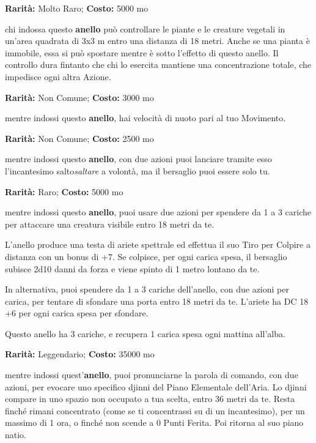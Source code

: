 \begin{multicols}{2}

\textbf{Rarità:} Molto Raro; \textbf{Costo:} 5000 mo

chi indossa questo \textbf{anello} può controllare le piante e le creature vegetali in un'area quadrata di 3x3 m entro una distanza di 18 metri. Anche se una pianta è immobile, essa si può spostare mentre è sotto l'effetto di questo anello. Il controllo dura fintanto che chi lo esercita mantiene una concentrazione totale, che impedisce ogni altra Azione.


\textbf{Rarità:} Non Comune; \textbf{Costo:} 3000 mo

mentre indossi questo \textbf{anello}, hai velocità di nuoto pari al tuo Movimento.


\textbf{Rarità:} Non Comune; \textbf{Costo:} 2500 mo

mentre indossi questo \textbf{anello}, con due azioni puoi lanciare tramite esso l'incantesimo salto\emph{saltare} a volontà, ma il bersaglio puoi essere solo tu.


\textbf{Rarità:} Raro; \textbf{Costo:} 5000 mo

mentre indossi questo \textbf{anello}, puoi usare due azioni per spendere da 1 a 3 cariche per attaccare una creatura visibile entro 18 metri da te.

L'anello produce una testa di ariete spettrale ed effettua il suo Tiro per Colpire a distanza con un bonus di +7. Se colpisce, per ogni carica spesa, il bersaglio subisce 2d10 danni da forza e viene spinto di 1 metro lontano da te.

In alternativa, puoi spendere da 1 a 3 cariche dell'anello, con due azioni per carica, per tentare di sfondare una porta entro 18 metri da te. L'ariete ha DC 18 +6 per ogni carica spesa per sfondare.

Questo anello ha 3 cariche, e recupera 1 carica spesa ogni mattina all'alba.


\textbf{Rarità:} Leggendario; \textbf{Costo:} 35000 mo

mentre indossi quest'\textbf{anello}, puoi pronunciarne la parola di comando, con due azioni, per evocare uno specifico djinni del Piano Elementale dell'Aria. Lo djinni compare in uno spazio non occupato a tua scelta, entro 36 metri da te. Resta finché rimani concentrato (come se ti concentrassi su di un incantesimo), per un massimo di 1 ora, o finché non scende a 0 Punti Ferita. Poi ritorna al suo piano natio.


\end{multicols}
